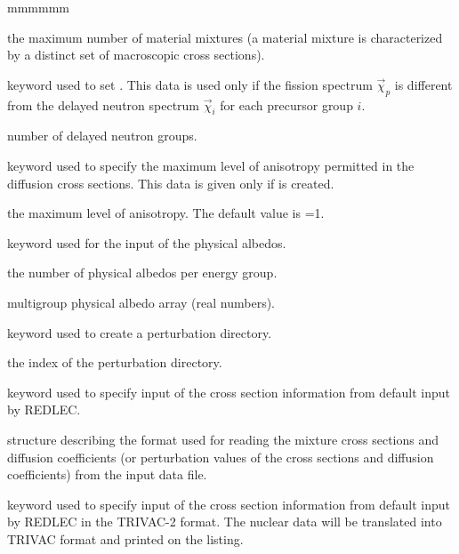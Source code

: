 \begin{ListeDeDescription}{mmmmmm}
\item[\dusa{nmixt}] the maximum number of material mixtures (a material mixture is characterized by a distinct set of macroscopic cross sections). 

\item[\moc{DELP}] keyword used to set . This data is used 
only if the fission spectrum $\vec{\chi}_p$ is different from the delayed neutron spectrum $\vec{\chi}_i$ for each precursor group $i$.

\item[\dusa{ndg}] number of delayed neutron groups.

\item[\moc{ANIS}] keyword used to specify the maximum  level of anisotropy
permitted in the diffusion cross sections. This data is given only if
 is created.

\item[\dusa{naniso}] the maximum level of anisotropy. The default value is =1.

\item[\moc{ALBP}] keyword used for the input of the physical albedos.

\item[\dusa{nalbp}] the number of physical albedos per energy group.

\item[\dusa{albedp}] multigroup physical albedo array (real numbers). 

\item[\moc{STEP}] keyword used to create a perturbation directory.

\item[\dusa{istep}] the index of the perturbation directory. 

\item[\moc{READ}] keyword used to specify input of the cross section
information from default input by REDLEC.

\item[\dstr{macxs}] structure describing the format used  for reading the
mixture cross sections and diffusion coefficients (or perturbation values of
the cross sections and diffusion coefficients) from the input data file.
 
\item[\moc{OLD}] keyword used to specify input of the cross section information 
from default input by REDLEC in the TRIVAC-2 format. The nuclear data will be
translated into TRIVAC format and printed on the listing.


\end{ListeDeDescription}
